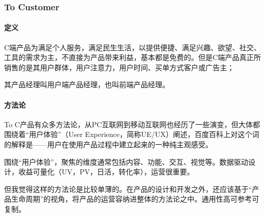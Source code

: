\documentclass[letterpaper,10pt,english]{sphinxmanual}
\begin{document}
\subsubsection{To Customer}
\label{\detokenize{chapter_introduction/2C:to-customer}}\label{\detokenize{chapter_introduction/2C::doc}}

\paragraph{定义}
\label{\detokenize{chapter_introduction/2C:id1}}
C端产品为满足个人服务，满足民生生活，以提供便捷、满足兴趣、欲望、社交、工具的需求为主，不直接为产品带来利益，基本都是免费的。但是C端产品真正所销售的是其用户群体，用户注意力，用户时间、买单方式客户或广告主；

其产品经理叫用户端产品经理，也叫前端产品经理。%
\begin{footnote}[99]\sphinxAtStartFootnote
{}
%
\end{footnote}


\paragraph{方法论}
\label{\detokenize{chapter_introduction/2C:id2}}
To
C产品有众多方法论，从PC互联网到移动互联网也经历了一些演变，但大体都围绕着“用户体验”（User
Experience，简称UE/UX）阐述，百度百科上对这个词的解释是——用户在使用产品过程中建立起来的一种纯主观感受。

围绕“用户体验”，聚焦的维度通常包括内容、功能、交互、视觉等。数据驱动设计，收益可量化（UV，PV，日活，转化率），运营很重要。%
\begin{footnote}[100]\sphinxAtStartFootnote
{}
%
\end{footnote}

但我觉得这样的方法论是比较单薄的。在产品的设计和开发之外，还应该基于“产品生命周期”的视角，将产品的运营容纳进整体的方法论之中。通用性高可参考可复制。
%
\begin{footnote}[101]\sphinxAtStartFootnote
{}
%
\end{footnote}
\end{document}
